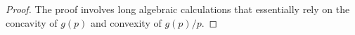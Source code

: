 \begin{proof} The proof involves long algebraic calculations that essentially rely on the concavity of $g(p)$ and convexity of $g(p)/p$.

\end{proof}
